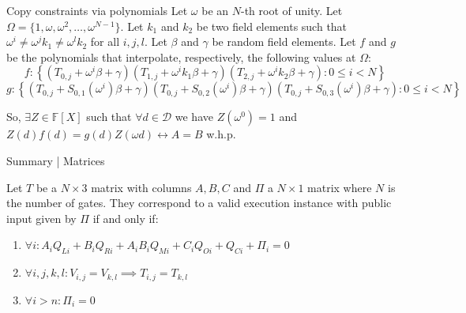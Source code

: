\documentclass{zkdl-presentation-template}
\begin{document}
    \begin{frame} {Copy constraints via polynomials}
        Let $\omega$ be an $N$-th root of unity. Let $\Omega = \{1, \omega, \omega^2, \ldots, \omega^{N-1}\}$. Let $k_1$ and $k_2$ be two field elements such that $\omega^i \neq \omega^j k_1 \neq \omega^l k_2$ for all $i, j, l$. Let $\beta$ and $\gamma$ be random field elements. Let $f$ and $g$ be the polynomials that interpolate, respectively, the following values at $\Omega$:
        \[f: \left\{\left(T_{0,j} + \omega^i \beta + \gamma\right)\left(T_{1,j} + \omega^i k_1 \beta + \gamma\right)\left(T_{2,j} + \omega^i k_2 \beta + \gamma\right) : 0 \leq i < N\right\}\]
        \[g: \left\{\left(T_{0,j} + S_{0,1}(\omega^i) \beta + \gamma\right)\left(T_{0,j} + S_{0,2}(\omega^i) \beta + \gamma\right)\left(T_{0,j} + S_{0,3}(\omega^i) \beta + \gamma\right) : 0 \leq i < N\right\}\]
        
        So, $\exists Z \in \mathbb{F}[X]$ such that $\forall d \in \mathcal{D}$ we have $Z(\omega^{0}) = 1$ and $Z(d)f(d) = g(d)Z(\omega d) \leftrightarrow A = B$ w.h.p.
    \end{frame}

    \begin{frame} {Summary | Matrices}
        \begin{definition}
            Let $T$ be a $N \times 3$ matrix with columns $A, B, C$ and $\Pi$ a $N \times 1$
            matrix where $N$ is the number of gates. They correspond to a valid execution
            instance with public input given by $\Pi$ if and only if:
            
            \begin{enumerate}
                \item \(\forall i: A_iQ_{Li} + B_iQ_{Ri} + A_iB_iQ_{Mi} + C_iQ_{Oi} + Q_{Ci} + \Pi_i = 0\)
                \item \(\forall i, j, k, l: V_{i,j} = V_{k,l} \implies T_{i,j} = T_{k,l}\)
                \item \(\forall i > n: \Pi_i = 0\)
            \end{enumerate}
        \end{definition}
    \end{frame}
\end{document}
